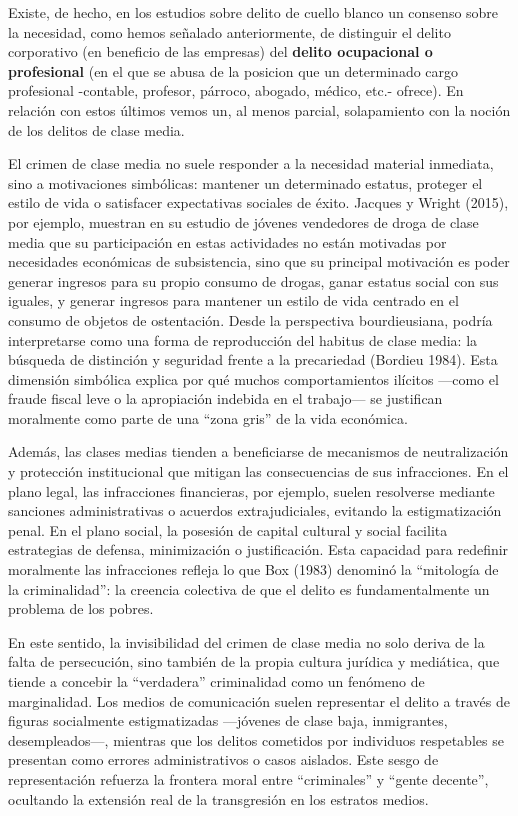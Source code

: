 \documentclass[
  spanish,
  letterpaper,
  DIV=11,
  numbers=noendperiod]{scrreprt}
\begin{document}
Existe, de hecho, en los estudios sobre delito de cuello blanco un
consenso sobre la necesidad, como hemos señalado anteriormente, de
distinguir el delito corporativo (en beneficio de las empresas) del
\textbf{delito ocupacional o profesional} (en el que se abusa de la
posicion que un determinado cargo profesional -contable, profesor,
párroco, abogado, médico, etc.- ofrece). En relación con estos últimos
vemos un, al menos parcial, solapamiento con la noción de los delitos de
clase media.

El crimen de clase media no suele responder a la necesidad material
inmediata, sino a motivaciones simbólicas: mantener un determinado
estatus, proteger el estilo de vida o satisfacer expectativas sociales
de éxito. Jacques y Wright (2015), por ejemplo, muestran en su estudio
de jóvenes vendedores de droga de clase media que su participación en
estas actividades no están motivadas por necesidades económicas de
subsistencia, sino que su principal motivación es poder generar ingresos
para su propio consumo de drogas, ganar estatus social con sus iguales,
y generar ingresos para mantener un estilo de vida centrado en el
consumo de objetos de ostentación. Desde la perspectiva bourdieusiana,
podría interpretarse como una forma de reproducción del habitus de clase
media: la búsqueda de distinción y seguridad frente a la precariedad
(Bordieu 1984). Esta dimensión simbólica explica por qué muchos
comportamientos ilícitos ---como el fraude fiscal leve o la apropiación
indebida en el trabajo--- se justifican moralmente como parte de una
``zona gris'' de la vida económica.

Además, las clases medias tienden a beneficiarse de mecanismos de
neutralización y protección institucional que mitigan las consecuencias
de sus infracciones. En el plano legal, las infracciones financieras,
por ejemplo, suelen resolverse mediante sanciones administrativas o
acuerdos extrajudiciales, evitando la estigmatización penal. En el plano
social, la posesión de capital cultural y social facilita estrategias de
defensa, minimización o justificación. Esta capacidad para redefinir
moralmente las infracciones refleja lo que Box (1983) denominó la
``mitología de la criminalidad'': la creencia colectiva de que el delito
es fundamentalmente un problema de los pobres.

En este sentido, la invisibilidad del crimen de clase media no solo
deriva de la falta de persecución, sino también de la propia cultura
jurídica y mediática, que tiende a concebir la ``verdadera''
criminalidad como un fenómeno de marginalidad. Los medios de
comunicación suelen representar el delito a través de figuras
socialmente estigmatizadas ---jóvenes de clase baja, inmigrantes,
desempleados---, mientras que los delitos cometidos por individuos
respetables se presentan como errores administrativos o casos aislados.
Este sesgo de representación refuerza la frontera moral entre
``criminales'' y ``gente decente'', ocultando la extensión real de la
transgresión en los estratos medios.
\end{document}
